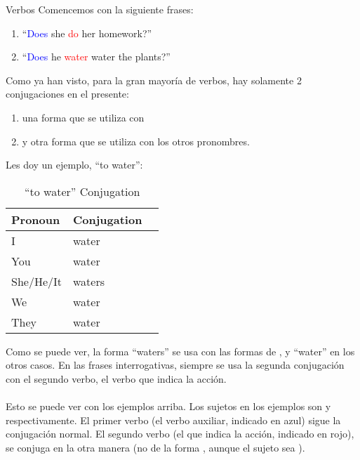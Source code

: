 \begin{conf}{Verbos}
	Comencemos con la siguiente frases:
	\begin{enumerate}
		\item ``\textcolor{blue}{Does} she \textcolor{red}{do} her homework?'' \arr
		\item ``\textcolor{blue}{Does} he \textcolor{red}{water} water the plants?''
			\arr {}
	\end{enumerate}

	Como ya han visto, para la gran mayoría de verbos, hay solamente 2 conjugaciones en el presente:
	\begin{enumerate}
		\item una forma que se utiliza con 
		\item y otra forma que se utiliza con los otros pronombres.
	\end{enumerate}
	Les doy un ejemplo, ``to water'':

	\begin{table}[H]
		\centering
		\begin{tabular}{lll}
		\toprule
			\textbf{Pronoun} & \textbf{Conjugation}\\
		\midrule
			I & water \\
			You & water \\
			She/He/It & waters \\
			We & water \\
			They & water \\
		\bottomrule
		\end{tabular}
		\caption{``to water'' Conjugation}
	\end{table}

	Como se puede ver, la forma ``waters'' se usa con las formas de , y ``water''
	en los otros casos.
	En las frases interrogativas, siempre se usa la segunda conjugación con el segundo verbo, el verbo que indica
	la acción. \\ \\

	Esto se puede ver con los ejemplos arriba. Los sujetos en los ejemplos son 
	y  respectivamente. El primer verbo (el verbo auxiliar, indicado en azul) sigue la conjugación normal.
	El segundo verbo (el que indica la acción, indicado en rojo), se conjuga en la otra manera (no de la forma ,
	aunque el sujeto sea ).
\end{conf}
